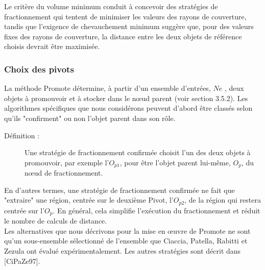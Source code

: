 Le critère du volume minimum conduit à concevoir des stratégies de fractionnement qui tentent de minimiser les valeurs des rayons de couverture, tandis que l'exigence de chevauchement minimum suggère que, pour des valeurs fixes des rayons de couverture, la distance entre les deux objets de référence choisis devrait être maximisée.

\subsubsection{Choix des pivots}
La méthode Promote détermine, à partir d'un ensemble d'entrées, $ Ne $ , deux objets à promouvoir et à stocker dans le nœud parent (voir section 3.5.2). Les algorithmes spécifiques que nous considérons peuvent d'abord être classés selon qu'ils "confirment" ou non l'objet parent dans son rôle.

\begin{description}
	\item[Définition : ]  Une stratégie de fractionnement confirmée choisit l'un des deux objets à promouvoir, par exemple l'$ O_{p1} $, pour être l'objet parent lui-même, $ O_p $, du nœud de fractionnement.
\end{description}

En d'autres termes, une stratégie de fractionnement confirmée ne fait que "extraire" une région, centrée sur le deuxième Pivot, l'$ O_{p2} $, de la région qui restera centrée sur l'$ O_p $. En général, cela simplifie l'exécution du fractionnement et réduit le nombre de calculs de distance.\\

Les alternatives que nous décrivons pour la mise en œuvre de Promote ne sont qu'un sous-ensemble sélectionné de l'ensemble que Ciaccia, Patella, Rabitti et Zezula ont évalué expérimentalement. Les autres stratégies sont décrit dans [CiPaZe97].

